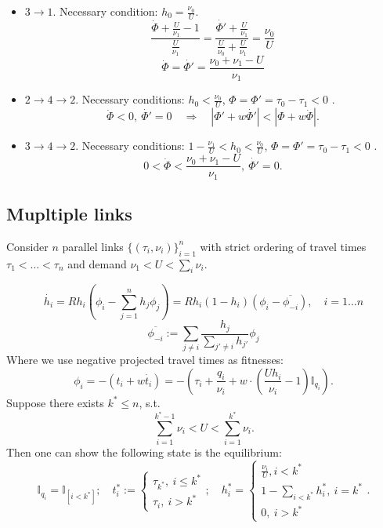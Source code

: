 \documentclass[12pt]{article}
\begin{document}
\begin{itemize}
	\item $3 \to 1$. Necessary condition: $h_0 = \frac{\nu_0}{U}$.
$$ \frac{ \dot{\Phi} + \frac{U}{\nu_1} - 1}{\frac{U}{\nu_1}} = \frac{\dot{\Phi'} + \frac{U}{\nu_1}}{\frac{U}{\nu_0} + \frac{U}{\nu_1}} = \frac{\nu_0}{U} $$
$$ \dot{\Phi}= \dot{\Phi'} = \frac{\nu_0 + \nu_1 - U}{\nu_1}$$


	\item $ 2 \to 4 \to 2$. Necessary conditions: $h_0 < \frac{\nu_0}{U}$, $\Phi = \Phi' = \tau_0 -\tau_1 < 0 $ .
	\\
	$$ \dot{\Phi} < 0 , ~\dot{\Phi'} = 0 \quad \Rightarrow \quad |\Phi' + w\dot{\Phi'}| < |\Phi + w\dot{\Phi}| . $$

\item $ 3 \to 4 \to 2$. Necessary conditions: $ 1 - \frac{\nu_1}{U} < h_0 < \frac{\nu_0}{U}$, $\Phi = \Phi' = \tau_0 -\tau_1 < 0 $ .
	\\
	$$ 0 < \dot{\Phi} < \frac{\nu_0 + \nu_1 - U}{\nu_1} , ~\dot{\Phi'} = 0 . $$


\end{itemize}

\newpage

\subsection*{Mupltiple links}

Consider $n$ parallel links $\{(\tau_i, \nu_i)\}_{i=1}^n$ with strict ordering of travel times $\tau_1 < \dots < \tau_n$ and demand $\nu_1 < U < \sum_{i} \nu_i$. 

$$ \dot{h_i} = R h_i( \phi_i - \sum_{j=1}^n h_j \phi_j ) = R h_i(1-h_i) \left( 
\phi_i - \overline{\phi_{-i}} \right) , \quad i = 1 \dots n $$
$$ \overline{\phi_{-i}} := \sum_{j \neq i} \frac{h_j}{\sum_{j' \neq i} h_{j'}} \phi_j  $$
Where we use negative projected travel times as fitnesses:
$$ \phi_i = - ( t_i + w \dot{t_i}) = -\left( \tau_i + \frac{q_i}{\nu_i} + w \cdot \left( \frac{Uh_i}{\nu_i} - 1 \right) \mathbb{I}_{q_i} \right) .$$
Suppose there exists $k^* \leq n$, s.t.
$$ \sum_{i=1}^{k^*-1} \nu_i < U < \sum_{i=1}^{k^*} \nu_i .$$
Then one can show the following state is the equilibrium:
$$ \mathbb{I}_{q_i} = \mathbb{I}_{[ i < k^* ]};  \quad t^*_i := \begin{cases} \tau_{k^*}, ~i \leq k^* \\ \tau_i, ~i > k^*  \end{cases}; \quad h^*_i = \begin{cases} \frac{\nu_i}{U}, i < k^* \\ 1 - \sum_{i < k^*} h^*_{i}, ~ i = k^*\\  0, ~i > k^*  \end{cases}. $$
\end{document}
